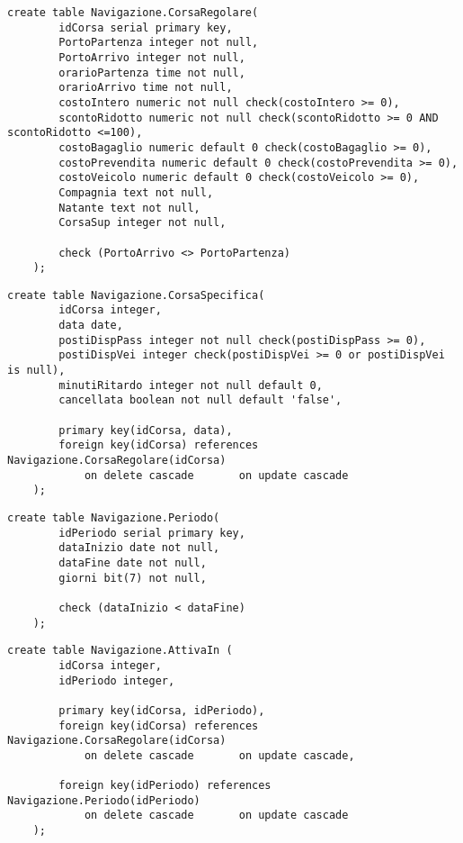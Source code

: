 \begin{lstlisting}[style=sqlstyle, title = {Creazione della tabella CorsaRegolare}]
    create table Navigazione.CorsaRegolare(
        idCorsa serial primary key,
        PortoPartenza integer not null,
        PortoArrivo integer not null,
        orarioPartenza time not null,
        orarioArrivo time not null,
        costoIntero numeric not null check(costoIntero >= 0),
        scontoRidotto numeric not null check(scontoRidotto >= 0 AND scontoRidotto <=100),
        costoBagaglio numeric default 0 check(costoBagaglio >= 0),
        costoPrevendita numeric default 0 check(costoPrevendita >= 0),
        costoVeicolo numeric default 0 check(costoVeicolo >= 0),
        Compagnia text not null,
        Natante text not null,
        CorsaSup integer not null,
    
        check (PortoArrivo <> PortoPartenza)
    );
\end{lstlisting}

\begin{lstlisting}[style=sqlstyle, title = {Creazione della tabella CorsaSpecifica}]
    create table Navigazione.CorsaSpecifica(
        idCorsa integer,
        data date,
        postiDispPass integer not null check(postiDispPass >= 0),
        postiDispVei integer check(postiDispVei >= 0 or postiDispVei is null),
        minutiRitardo integer not null default 0,
        cancellata boolean not null default 'false',
    
        primary key(idCorsa, data),
        foreign key(idCorsa) references Navigazione.CorsaRegolare(idCorsa)
            on delete cascade       on update cascade
    );
\end{lstlisting}

\begin{lstlisting}[style=sqlstyle, title = {Creazione della tabella Periodo}]
    create table Navigazione.Periodo(
        idPeriodo serial primary key,
        dataInizio date not null,
        dataFine date not null,
        giorni bit(7) not null,
    
        check (dataInizio < dataFine)
    );
\end{lstlisting}

\begin{lstlisting}[style=sqlstyle, title = {Creazione della tabella AttivaIn}]
    create table Navigazione.AttivaIn (
        idCorsa integer,
        idPeriodo integer,
    
        primary key(idCorsa, idPeriodo),
        foreign key(idCorsa) references Navigazione.CorsaRegolare(idCorsa)
            on delete cascade       on update cascade,
    
        foreign key(idPeriodo) references Navigazione.Periodo(idPeriodo)
            on delete cascade       on update cascade
    );
\end{lstlisting}

